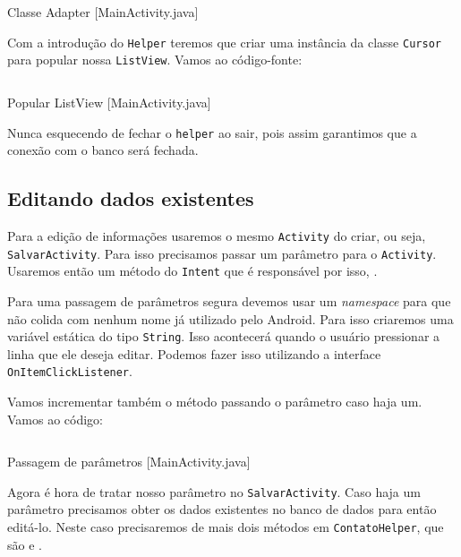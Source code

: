 \begin{listing}[H]
  \inputminted[linenos=true,frame=bottomline,tabsize=3]{ java }{ source/MainActivity-5.java }
  \caption{Classe Adapter [MainActivity.java]}
\end{listing}

Com a introdução do \texttt{Helper} teremos que criar uma instância da classe \texttt{Cursor}
para popular nossa \texttt{ListView}. Vamos ao código-fonte:

\begin{listing}[H]
  \inputminted[linenos=true,frame=bottomline,tabsize=3]{ java }{ source/MainActivity-6.java }
  \caption{Popular ListView [MainActivity.java]}
\end{listing}

Nunca esquecendo de fechar o \texttt{helper} ao sair, pois assim garantimos que a conexão com
o banco será fechada.

\subsection{Editando dados existentes\label{ssec:edit}}

Para a edição de informações usaremos o mesmo \texttt{Activity} do criar, ou seja, \texttt{SalvarActivity}.
Para isso precisamos passar um parâmetro para o \texttt{Activity}. Usaremos então um método do
\texttt{Intent} que é responsável por isso, .

Para uma passagem de parâmetros segura devemos usar um \textit{namespace} para que não colida com
nenhum nome já utilizado pelo Android. Para isso criaremos uma variável estática do tipo \texttt{String}.
Isso acontecerá quando o usuário pressionar a linha que ele deseja editar. Podemos fazer isso utilizando
a interface \texttt{OnItemClickListener}.

Vamos incrementar também o método  passando o parâmetro caso haja um. Vamos ao
código:

\begin{listing}[H]
  \inputminted[linenos=true,frame=bottomline,tabsize=3]{ java }{ source/MainActivity-7.java }
  \caption{Passagem de parâmetros [MainActivity.java]}
\end{listing}

Agora é hora de tratar nosso parâmetro no \texttt{SalvarActivity}. Caso haja um parâmetro precisamos
obter os dados existentes no banco de dados para então editá-lo. Neste caso precisaremos de mais dois
métodos em \texttt{ContatoHelper}, que são  e .

